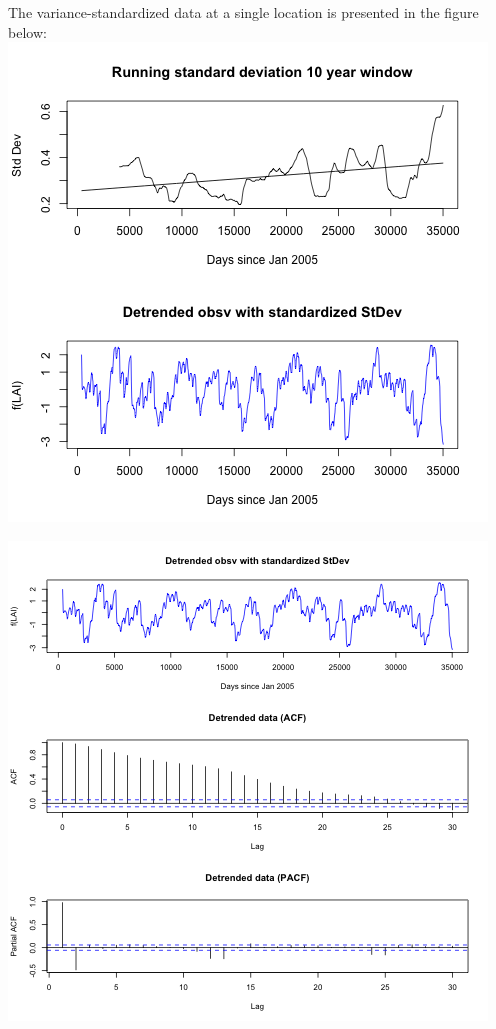 \documentclass[11pt]{article}
\begin{document}
The variance-standardized data at a single location is presented in the figure
below:
\includegraphics{../img/standatdized_var_LAI.png}

\includegraphics{../img/detrended_stdzd_acf_pacf.png}
\end{document}
